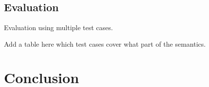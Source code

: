 \documentclass[adraft, copyright, creativecommons]{eptcs} %
\begin{document}
\subsection{Evaluation}
Evaluation using multiple test cases.

Add a table here which test cases cover what part of the semantics.
\section{Conclusion}


\end{document}
